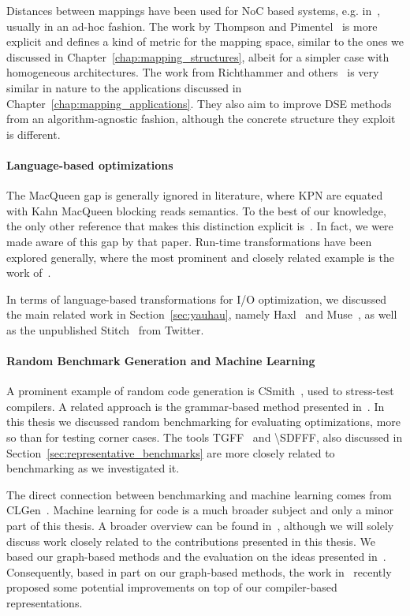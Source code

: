 Distances between mappings have been used for \ac{NoC} based systems, e.g. in~\cite{singh2010communication,weichslgartner2014daarm}, usually in an ad-hoc fashion.
The work by Thompson and Pimentel~\cite{thompson2013exploiting} is more explicit and defines a kind of metric for the mapping space, similar to the ones we discussed in Chapter~\ref{chap:mapping_structures}, albeit for a simpler case with homogeneous architectures.
The work from Richthammer and others~\cite{richthammer2018search,richthammer_todaes20} is very similar in nature to the applications discussed in Chapter~\ref{chap:mapping_applications}.
They also aim to improve \ac{DSE} methods from an algorithm-agnostic fashion, although the concrete structure they exploit is different.

\paragraph{Language-based optimizations} 
The MacQueen gap is generally ignored in literature, where \ac{KPN} are equated with Kahn MacQueen blocking reads semantics. 
To the best of our knowledge, the only other reference that makes this distinction explicit is~\cite{lee_matsikoudis_semantics}.
In fact, we were made aware of this gap by that paper.
Run-time transformations have been explored generally, where the most prominent and closely related example is the work of~\cite{schor2014adapnet}.

In terms of language-based transformations for \ac{I/O} optimization, we discussed the main related work in Section~\ref{sec:yauhau}, namely Haxl~\cite{marlow2014haxl} and Muse~\cite{muse},
as well as the unpublished Stitch~\cite{stitch} from Twitter.

\paragraph{Random Benchmark Generation and Machine Learning}
A prominent example of random code generation is CSmith~\cite{csmith}, used to stress-test compilers.
A related approach is the grammar-based method presented in~\cite{mckenzie1997generating}.
In this thesis we discussed random benchmarking for evaluating optimizations, more so than for testing corner cases.
The tools \ac{TGFF}~\cite{dick1998tgff} and \ac{\SDFFF}\cite{sdf3}, also discussed in Section~\ref{sec:representative_benchmarks} are more closely related to benchmarking as we investigated it.

The direct connection between benchmarking and machine learning comes from CLGen~\cite{cummins_cgo2017}.
Machine learning for code is a much broader subject and only a minor part of this thesis.
A broader overview can be found in~\cite{allamanis2018survey}, although we will solely discuss work closely related to the contributions presented in this thesis. 
We based our graph-based methods and the evaluation on the ideas presented in~\cite{cummins_pact17,inst2vec}.
Consequently, based in part on our graph-based methods, the work in~\cite{cummins_programl,ye2020deep} recently proposed some potential improvements on top of our compiler-based representations.